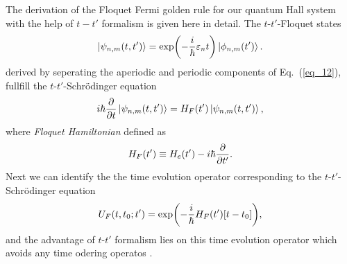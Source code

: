 The derivation of the Floquet Fermi golden rule for our quantum Hall system with the help of $t-t'$ formalism is given here in detail. The $t$-$t'$-Floquet states \cite{grifoni98,wackerl20}
\begin{equation} \label{eq_c1}
  \ket{\psi_{n,m}(t,t')} =
  \exp(-\frac{i}{\hbar}\varepsilon_{n} t)\ket{\phi_{n,m}(t')}.
\end{equation}
derived by seperating the aperiodic and periodic components of Eq.~(\ref{eq_12}), fullfill the $t$-$t'$-Schrödinger equation \cite{grifoni98,wackerl20}
\begin{equation} \label{eq_c2}
  i \hbar \pdv{t}\ket{\psi_{n,m}(t,t')} =
  H_F(t') \ket{\psi_{n,m}(t,t')},
\end{equation}
where \textit{Floquet Hamiltonian} defined as
\begin{equation} \label{eq_c3}
  H_F(t') \equiv
  H_e(t') - i\hbar \pdv{t'}.
\end{equation}
Next we can identify the the time evolution operator corresponding to the $t$-$t'$-Schrödinger equation
\begin{equation} \label{eq_c4}
  U_F(t,t_0;t') = \exp(-\frac{i}{\hbar}H_F(t')\qty[t-t_0]),
\end{equation}
and the advantage of $t$-$t'$ formalism lies on this time evolution operator which avoids any time odering operatos \cite{wackerl20}.

